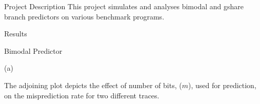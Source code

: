 
\begin{section}{Project Description}
This project simulates and analyses bimodal and gshare branch predictors on various benchmark programs.
\end{section}


\begin{section}{Results}

    \begin{subsection}{Bimodal Predictor}

        \begin{center}
        (a)
        \end{center}

    The adjoining plot depicts the effect of number of bits, ($m$), used for prediction, on the misprediction rate for two different traces. 
    

\end{subsection}
\end{section}
